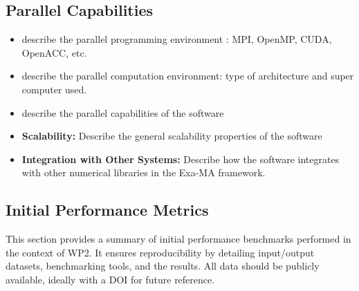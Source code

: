 \subsection{Parallel Capabilities}
\label{sec:WP2:Feelpp:performances}


\begin{itemize}
    \item describe the parallel programming  environment : MPI, OpenMP, CUDA, OpenACC, etc.
    \item describe the parallel computation environment: type of architecture and super computer used.
    \item describe the parallel capabilities of the software
    \item \textbf{Scalability:} Describe the general scalability properties of the software
    \item \textbf{Integration with Other Systems:} Describe how the software integrates with other numerical libraries in the Exa-MA framework.
\end{itemize}


\subsection{Initial Performance Metrics}
\label{sec:WP2:Feelpp:metrics}

This section provides a summary of initial performance benchmarks performed in the context of WP2. It ensures reproducibility by detailing input/output datasets, benchmarking tools, and the results. All data should be publicly available, ideally with a DOI for future reference.

